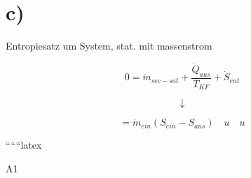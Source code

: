 

\section*{c)}
Entropiesatz um System, stat. mit massenstrom

\[
0 = \dot{m}_{sec-sat} + \frac{\dot{Q}_{aus}}{T_{KF}} + \dot{S}_{ent}
\]

\[
\downarrow
\]

\[
= \dot{m}_{ein} (S_{ein} - S_{aus}) \quad u \quad u
\]

``````latex


A1